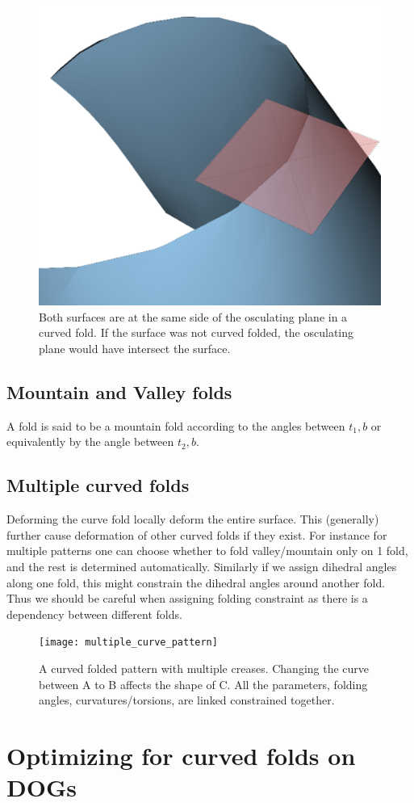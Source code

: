 \documentclass{article}
\theoremstyle{definition}
\begin{document}
\begin{figure} [h]
	\centering
	\includegraphics[width=0.5\linewidth]{plane_side}
	\caption{Both surfaces are at the same side of the osculating plane in a curved fold. If the surface was not curved folded, the osculating plane would have intersect the surface.}
	\label{fig:curved_fold_through_curve}
\end{figure}

\subsection{Mountain and Valley folds}
A fold is said to be a mountain fold according to the angles between $t_1,b$ or equivalently by the angle between $t_2,b$.

\subsection{Multiple curved folds}
Deforming the curve fold locally deform the entire surface. This (generally) further cause deformation of other curved folds if they exist. For instance for multiple patterns one can choose whether to fold valley/mountain only on 1 fold, and the rest is determined automatically. Similarly if we assign dihedral angles along one fold, this might constrain the dihedral angles around another fold. Thus we should be careful when assigning folding constraint as there is a dependency between different folds.

\begin{figure} [h]
	\centering
	\texttt{[image: multiple\_curve\_pattern]}
	\caption{A curved folded pattern with multiple creases. Changing the curve between A to B affects the shape of C. All the parameters, folding angles, curvatures/torsions, are linked constrained together.}
	\label{fig:folding_an_edge.pdf}
\end{figure}
	
\section{Optimizing for curved folds on DOGs}
\end{document}
